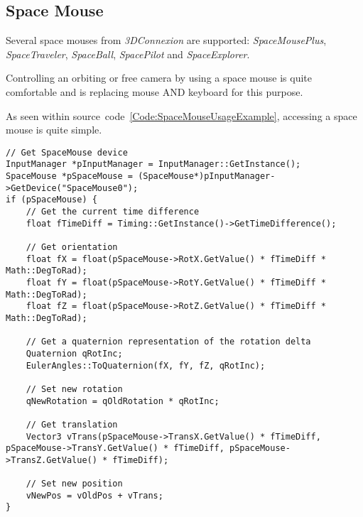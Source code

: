 \subsection{Space Mouse}
Several space mouses from \emph{3DConnexion} are supported: \emph{SpaceMousePlus}, \emph{SpaceTraveler}, \emph{SpaceBall}, \emph{SpacePilot} and \emph{SpaceExplorer}.

Controlling an orbiting or free camera by using a space mouse is quite comfortable and is replacing mouse AND keyboard for this purpose.

As seen within source~code~\ref{Code:SpaceMouseUsageExample}, accessing a space mouse is quite simple.
\begin{lstlisting}[float=htb,label=Code:SpaceMouseUsageExample,caption={Space mouse usage example}]
// Get SpaceMouse device
InputManager *pInputManager = InputManager::GetInstance();
SpaceMouse *pSpaceMouse = (SpaceMouse*)pInputManager->GetDevice("SpaceMouse0");
if (pSpaceMouse) {
	// Get the current time difference
	float fTimeDiff = Timing::GetInstance()->GetTimeDifference();

	// Get orientation
	float fX = float(pSpaceMouse->RotX.GetValue() * fTimeDiff * Math::DegToRad);
	float fY = float(pSpaceMouse->RotY.GetValue() * fTimeDiff * Math::DegToRad);
	float fZ = float(pSpaceMouse->RotZ.GetValue() * fTimeDiff * Math::DegToRad);

	// Get a quaternion representation of the rotation delta
	Quaternion qRotInc;
	EulerAngles::ToQuaternion(fX, fY, fZ, qRotInc);

	// Set new rotation
	qNewRotation = qOldRotation * qRotInc;

	// Get translation
	Vector3 vTrans(pSpaceMouse->TransX.GetValue() * fTimeDiff, pSpaceMouse->TransY.GetValue() * fTimeDiff, pSpaceMouse->TransZ.GetValue() * fTimeDiff);

	// Set new position
	vNewPos = vOldPos + vTrans;
}
\end{lstlisting}

